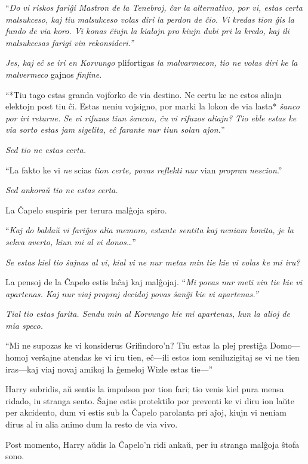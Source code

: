 ``\emph{Do vi riskos fariĝi Mastron de la Tenebroj, ĉar la
  alternativo, por vi, estas certa malsukceso, kaj tiu malsukceso
  volas diri la perdon de ĉio. Vi kredas tion ĝis la fundo de via
  koro. Vi konas ĉiujn la kialojn pro kiujn dubi pri la kredo, kaj ili
  malsukcesas farigi vin rekonsideri.''}

\emph{Jes, kaj eĉ se iri en Korvungo} plifortigas \emph{la
  malvarmecon, tio ne volas diri ke la malvermeco} gajnos
\emph{finfine}.

``*Tiu tago estas granda vojforko de via destino. Ne certu ke ne estos
aliajn elektojn post tiu ĉi. Estas neniu vojsigno, por marki la lokon
de via lasta* \emph{ŝanco por iri returne. Se vi rifuzas tiun ŝancon,
  ĉu vi rifuzos aliajn? Tio eble estas ke via sorto estas jam
  sigelita, eĉ farante nur tiun solan aĵon.}''

\emph{Sed tio ne estas certa.}

``La fakto ke vi \emph{ne} scias \emph{tion certe, povas reflekti nur}
vian \emph{propran nescion}.''

\emph{Sed ankoraŭ tio ne estas certa.}

La Ĉapelo suspiris per terura malĝoja spiro.

``\emph{Kaj do baldaŭ vi fariĝos alia memoro, estante sentita kaj
neniam konita, je la sekva averto, kiun mi al vi donos\ldots}''

\emph{Se estas kiel tio ŝajnas al vi, kial vi ne nur metas min tie kie
  vi volas ke mi iru?}

La pensoj de la Ĉapelo estis laĉaj kaj malĝojaj. ``\emph{Mi povas nur
  meti vin tie kie vi apartenas. Kaj nur viaj propraj decidoj povas ŝanĝi
  kie vi apartenas.''}

\emph{Tial tio estas farita. Sendu min al Korvungo kie mi apartenas,
  kun la alioj de mia speco.}

``Mi ne supozas ke vi konsiderus Grifindoro'n? Tiu estas la plej
prestiĝa Domo—homoj verŝajne atendas ke vi iru tien, eĉ—ili estos iom
seniluzigitaj se vi ne tien iras—kaj viaj novaj amikoj la ĝemeloj
Wizle estas tie—''

Harry subridis, aŭ sentis la impulson por tion fari; tio venis kiel
pura mensa ridado, iu stranga sento. Ŝajne estis protektilo por
preventi ke vi diru ion laŭte per akcidento, dum vi estis sub la
Ĉapelo parolanta pri aĵoj, kiujn vi neniam dirus al iu alia animo dum
la resto de via vivo.

Post momento, Harry aŭdis la Ĉapelo'n ridi ankaŭ, per iu stranga
malĝoja ŝtofa sono.

